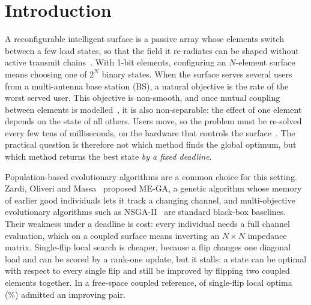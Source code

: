 \documentclass[runningheads]{llncs}
\begin{document}
\section{Introduction}
A reconfigurable intelligent surface is a passive array whose elements switch between a few load states, so that the field it re-radiates can be shaped without active transmit chains~\cite{li2026tutorial}. With 1-bit elements, configuring an $N$-element surface means choosing one of $2^N$ binary states. When the surface serves several users from a multi-antenna base station (BS), a natural objective is the rate of the worst served user. This objective is non-smooth, and once mutual coupling between elements is modelled~\cite{qian2020mutual,zheng2024mutual,nerini2024universal,nerini2026global}, it is also non-separable: the effect of one element depends on the state of all others. Users move, so the problem must be re-solved every few tens of milliseconds, on the hardware that controls the surface~\cite{urbinati2026ondevice}. The practical question is therefore not which method finds the global optimum, but which method returns the best state \emph{by a fixed deadline}.

Population-based evolutionary algorithms are a common choice for this setting. Zardi, Oliveri and Massa~\cite{zardi2024memory} proposed ME-GA, a genetic algorithm whose memory of earlier good individuals lets it track a changing channel, and multi-objective evolutionary algorithms such as NSGA-II~\cite{deb2002fast} are standard black-box baselines. Their weakness under a deadline is cost: every individual needs a full channel evaluation, which on a coupled surface means inverting an $N\times N$ impedance matrix. Single-flip local search is cheaper, because a flip changes one diagonal load and can be scored by a rank-one update, but it stalls: a state can be optimal with respect to every single flip and still be improved by flipping two coupled elements together. In a free-space coupled reference,  of  single-flip local optima (\%) admitted an improving pair.
\end{document}
